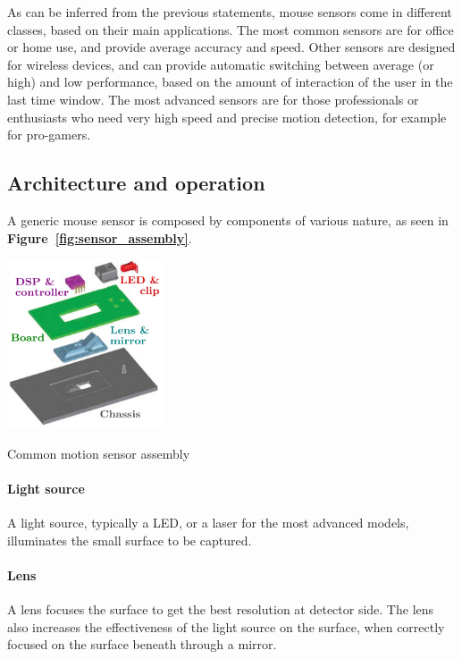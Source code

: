 \documentclass[a4paper,10pt]{article}
\makeatletter
\newenvironment{figurehere}{\def\@captype{figure}\vspace{2ex}}{\vspace{2ex}}
\newcommand{\citef}[1]{\textbf{Figure~\ref{#1}}}
\makeatother
\begin{document}
\begin{multicols}{2}
As can be inferred from the previous statements, mouse sensors come in
different classes, based on their main applications. The most common sensors
are for office or home use, and provide average accuracy and speed. Other
sensors are designed for wireless devices, and can provide automatic switching
between average (or high) and low performance, based on the amount of
interaction of the user in the last time window. The most advanced sensors are
for those professionals or enthusiasts who need very high speed and precise
motion detection, for example for pro-gamers.


\subsection{Architecture and operation}

A generic mouse sensor is composed by components of various nature, as seen
in \citef{fig:sensor_assembly}.

\begin{figurehere}
	\centering
	\includegraphics[keepaspectratio=true,height=5cm]{images/sensor_assembly.pdf}
	\caption{Common motion sensor assembly}
	\label{fig:sensor_assembly}
\end{figurehere}


\paragraph{Light source}
A light source, typically a LED, or a laser for the most advanced models,
illuminates the small surface to be captured.


\paragraph{Lens}
A lens focuses the surface to get the best resolution at detector side.
The lens also increases the effectiveness of the light source on the surface,
when correctly focused on the surface beneath through a mirror.


\end{multicols}
\end{document}
